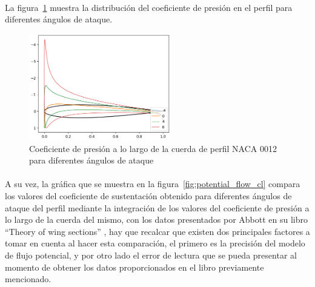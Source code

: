 \documentclass[letterpaper, openright, 12pt]{book}
\begin{document}
    \paragraph*{}
    La figura~\ref{fig:potential_flow_cp_dist} muestra la distribución del
    coeficiente de presión en el perfil para diferentes ángulos de ataque.
    \begin{figure}[htbp!]
        \centering
        \includegraphics[keepaspectratio,
            width=0.55\textwidth]{./img/potential_flow_cps}
        \caption[Coeficiente de presión a lo largo de la cuerda de perfil
        NACA 0012]
        {Coeficiente de presión a lo largo de la cuerda de perfil NACA 0012
        para diferentes ángulos de ataque}\label{fig:potential_flow_cp_dist}
    \end{figure}

    \paragraph*{}
    A su vez, la gráfica que se muestra en la
    figura~\ref{fig:potential_flow_cl} compara los valores del coeficiente de
    sustentación obtenido para diferentes ángulos de ataque del perfil
    mediante la integración de los valores del coeficiente de presión a lo
    largo de la cuerda del mismo, con los datos presentados por Abbott en su
    libro ``Theory of wing sections'' \cite{abbott}, hay que recalcar que
    existen dos principales factores a tomar en cuenta al hacer esta
    comparación, el primero es la precisión del modelo de flujo potencial, y
    por otro lado el error de lectura que se pueda presentar al momento de
    obtener los datos proporcionados en el libro previamente mencionado.
\end{document}
